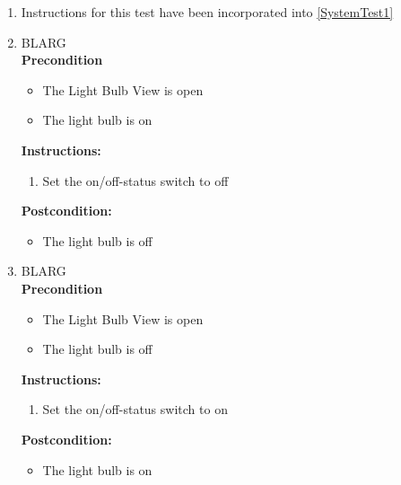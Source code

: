 \documentclass[a4paper]{article}
\newlength{\testlabellength}
\newenvironment{testlist}{\begin{enumerate}[label=\bfseries Instruction \thesubsection.\arabic* , labelindent=0pt, labelwidth=\testlabellength , leftmargin=2cm]}{\end{enumerate}}
\newenvironment{precondition}{
{\color{white}BLARG}\\ 
\textbf{Precondition}
\begin{itemize}[labelindent=0cm, labelwidth=2cm , leftmargin=1cm]
}
{\end{itemize}}
\newenvironment{instruction}{
\textbf{Instructions:}
\begin{enumerate}[label=\bfseries  \arabic*., labelindent=0cm, labelwidth=2cm , leftmargin=1cm]
}
{\end{enumerate}}
\newenvironment{postcondition}{
\textbf{Postcondition:}
\begin{itemize}[labelindent=0cm, labelwidth=2cm , leftmargin=1cm]
}
{\end{itemize}}
\begin{document}
\begin{appendices}
\begin{testlist}

	\item
		Instructions for this test have been incorporated into \ref{SystemTest1}

	\item
		\begin{precondition}
			\item The Light Bulb View is open
			\item The light bulb is on
		\end{precondition}
		\begin{instruction}
			\item Set the on/off-status switch to off
		\end{instruction}
		\begin{postcondition}
			\item The light bulb is off
		\end{postcondition}

	\item
		\begin{precondition}
			\item The Light Bulb View is open
			\item The light bulb is off
		\end{precondition}
		\begin{instruction}
			\item Set the on/off-status switch to on
		\end{instruction}
		\begin{postcondition}
			\item The light bulb is on
		\end{postcondition}


\end{testlist}
\end{appendices}
\end{document}
